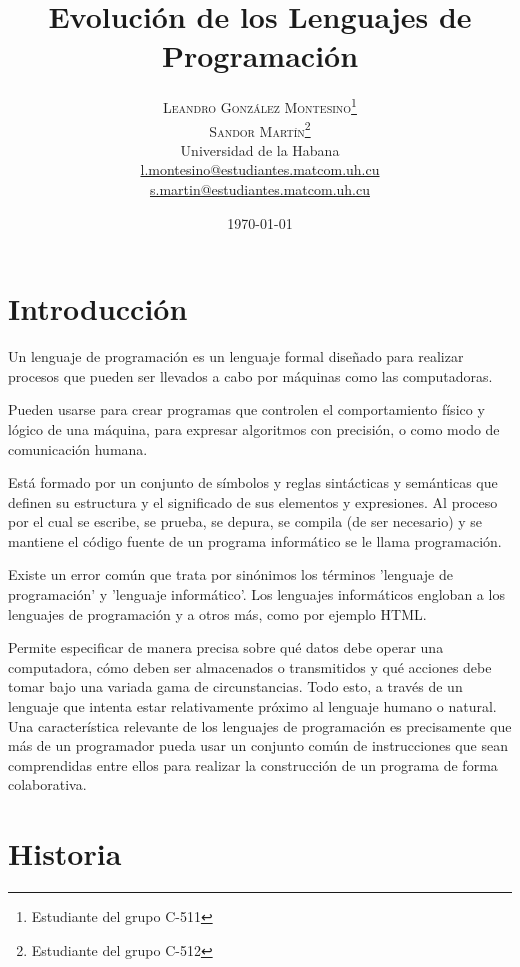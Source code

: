 \documentclass[twoside,twocolumn]{article}
\title{Evolución de los Lenguajes de Programación} %
\author{%
\textsc{Leandro González Montesino}\thanks{Estudiante del grupo C-511} \\[1ex] %
\textsc{Sandor Martín}\thanks{Estudiante del grupo C-512} \\[1ex]
\normalsize Universidad de la Habana \\ %
\normalsize \href{mailto:l.montesino@estudiantes.matcom.uh.cu}{l.montesino@estudiantes.matcom.uh.cu}\\ %
\normalsize \href{mailto:s.martin@estudiantes.matcom.uh.cu}{s.martin@estudiantes.matcom.uh.cu}
}
\date{\today} %
\begin{document}
\maketitle


\section{Introducción}

Un lenguaje de programación es un lenguaje formal diseñado para realizar procesos que pueden ser llevados a cabo por máquinas como las computadoras.

Pueden usarse para crear programas que controlen el comportamiento físico y lógico de una máquina, para expresar algoritmos con precisión, o como modo de comunicación humana.

Está formado por un conjunto de símbolos y reglas sintácticas y semánticas que definen su estructura y el significado de sus elementos y expresiones. Al proceso por el cual se escribe, se prueba, se depura, se compila (de ser necesario) y se mantiene el código fuente de un programa informático se le llama programación.

Existe un error común que trata por sinónimos los términos 'lenguaje de programación' y 'lenguaje informático'. Los lenguajes informáticos engloban a los lenguajes de programación y a otros más, como por ejemplo HTML\cite{w3c}.

Permite especificar de manera precisa sobre qué datos debe operar una computadora, cómo deben ser almacenados o transmitidos y qué acciones debe tomar bajo una variada gama de circunstancias. Todo esto, a través de un lenguaje que intenta estar relativamente próximo al lenguaje humano o natural. Una característica relevante de los lenguajes de programación es precisamente que más de un programador pueda usar un conjunto común de instrucciones que sean comprendidas entre ellos para realizar la construcción de un programa de forma colaborativa.



\section{Historia}
\end{document}

